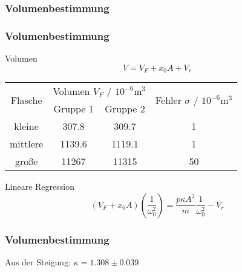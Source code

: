 \documentclass{beamer}
\begin{document}
\subsubsection{Volumenbestimmung}

\begin{frame}
\frametitle{Volumenbestimmung}

\begin{block}{Volumen}
$$V = V_F + x_0A + V_r$$
\end{block}

\begin{table}
\begin{tabular}{|c|c|c|c|}
\hline
\multirow{2}{*}{Flasche} & \multicolumn{2}{c|}{Volumen $V_F$ / $10^{-6}\mathrm m^3$} & \multirow{2}{*}{Fehler $\sigma$ / $10^{-6}\mathrm m^3$} \\
\cline{2-3}
& Gruppe 1 & Gruppe 2 & \\
\hline
 kleine & 307.8 & 309.7 & 1\\
\hline
mittlere & 1139.6 & 1119.1 & 1\\
\hline
große & 11267 & 11315 & 50\\
\hline
\end{tabular}
\end{table}

\begin{block}{Lineare Regression}
$$(V_F+x_0A)\left( \frac 1{\omega_0^2} \right) = \frac{p\kappa A^2}m \frac 1{\omega_0^2} - V_r$$
\end{block}

\end{frame}


\begin{frame}
\frametitle{Volumenbestimmung}

\begin{figure}
\begin{minipage}[t]{0.49\linewidth}
\centering
\end{minipage}
\hfill
\begin{minipage}[t]{0.49\linewidth}
\centering
\end{minipage}
\end{figure}
Aus der Steigung: \hspace{0.2cm} $\kappa = 1.308 \pm 0.039$

\end{frame}
\end{document}
